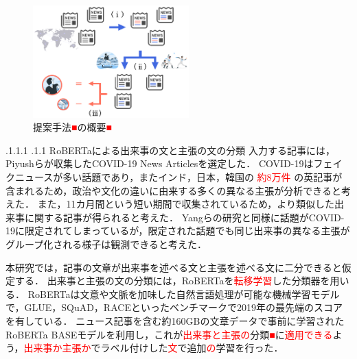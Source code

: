 \documentclass[a4paper, twocolumn, 10pt]{jarticle}
\makeatletter
\def\subsection{%
	\@startsection{subsection}{1}{\z@}%
	{.1\Cvs \@plus.1\Cdp \@minus.1\Cdp}%
	{.1\Cvs \@plus.1\Cdp}%
	{\normalfont\normalsize\bfseries}%
}
\makeatother
\begin{document}
\begin{figure}[H]
	\centering
	\includegraphics[keepaspectratio, width=60mm]{img/system_abstract.png}
	\caption{
    提案手法\textcolor{red}{■}の概要\textcolor{red}{■}
  }
	\label{system_abstract}
\end{figure}

\subsection{RoBERTaによる出来事の文と主張の文の分類}
入力する記事には，Piyushらが収集したCOVID-19 News Articlesを選定した\cite{ghasiya_investigating_2021}．
COVID-19はフェイクニュースが多い話題であり，またインド，日本，韓国の
\textcolor{red}{約8万件}
の英記事が含まれるため，政治や文化の違いに由来する多くの異なる主張が分析できると考えた．
また，11カ月間という短い期間で収集されているため，より類似した出来事に関する記事が得られると考えた．
Yangらの研究と同様に話題がCOVID-19に限定されてしまっているが，限定された話題でも同じ出来事の異なる主張がグループ化される様子は観測できると考えた．

本研究では，記事の文章が出来事を述べる文と主張を述べる文に二分できると仮定する．
出来事と主張の文の分類には，RoBERTaを\textcolor{red}{転移学習}した分類器を用いる．
RoBERTaは文意や文脈を加味した自然言語処理が可能な機械学習モデルで，GLUE，SQuAD，RACEといったベンチマークで2019年の最先端のスコアを有している\cite{liu_roberta_2019}．
ニュース記事を含む約160GBの文章データで事前に学習されたRoBERTa BASEモデルを利用し，これが\textcolor{red}{出来事と主張の}分類\textcolor{red}{■}に\textcolor{red}{適用できる}よう，\textcolor{red}{出来事か主張か}でラベル付けした\textcolor{red}{文}で追加\textcolor{red}{の}学習を行った．
\end{document}
